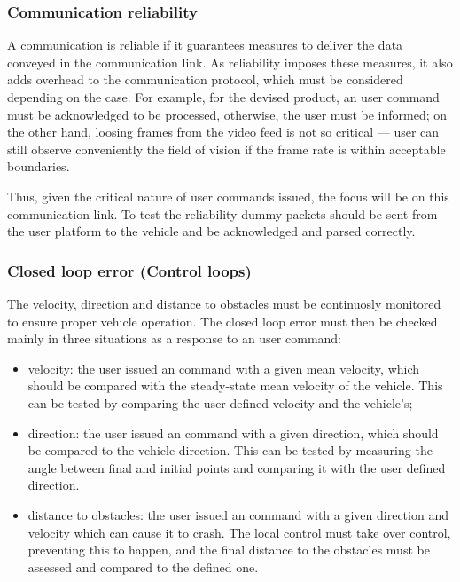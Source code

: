 \subsubsection{Communication reliability}%
\label{sec:comm-reli}
A communication is reliable if it guarantees measures to deliver the data
conveyed in the communication link. As reliability imposes these measures, it
also adds overhead to the communication protocol, which must be considered
depending on the case. For example, for the devised product, an user command
must be acknowledged to be processed, otherwise, the user must be informed; on
the other hand, loosing frames from the video feed is not so critical --- user
can still observe conveniently the field of vision if the frame rate is within
acceptable boundaries. 

Thus, given the critical nature of user commands issued, the focus will be on
this communication link. To test the reliability dummy packets should be sent
from the user platform to the vehicle and be acknowledged and parsed correctly.

\subsubsection{Closed loop error (Control loops)}%
\label{sec:closed-loop-error}
The velocity, direction and distance to obstacles must be continuosly monitored
to ensure proper vehicle operation. The closed loop error must then be checked
mainly in three situations as a response to an user command:
\begin{itemize}
\item velocity: the user issued an command with a given mean velocity, which
  should be compared with the steady-state mean velocity of the vehicle. This
  can be tested by comparing the user defined velocity and the vehicle's;
\item direction: the user issued an command with a given direction, which should
  be compared to the vehicle direction. This can be tested by measuring the
  angle between final and initial points and comparing it with the user defined
  direction.
\item distance to obstacles: the user issued an command with a given direction
  and velocity which can cause it to crash. The local control must take over
  control, preventing this to happen, and the final distance to the obstacles
  must be assessed and compared to the defined one.
\end{itemize}

